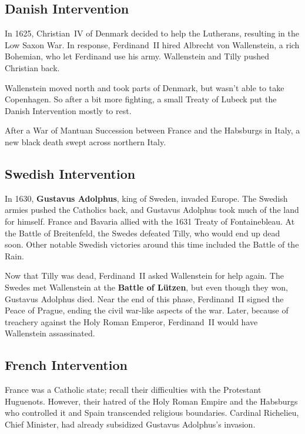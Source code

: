 \subsection*{Danish Intervention}

In 1625, Christian~IV of Denmark decided to help the Lutherans, resulting in the Low Saxon War.
In response, Ferdinand~II hired Albrecht von Wallenstein, a rich Bohemian,
who let Ferdinand use his army.
Wallenstein and Tilly pushed Christian back.

Wallenstein moved north and took parts of Denmark, but wasn't able to take Copenhagen.
So after a bit more fighting, a small Treaty of Lubeck put the Danish Intervention mostly to rest.

After a War of Mantuan Succession between France and the Habsburgs in Italy,
a new black death swept across northern Italy.

\subsection*{Swedish Intervention}

In 1630, \textbf{Gustavus Adolphus}, king of Sweden, invaded Europe.
The Swedish armies pushed the Catholics back, and Gustavus Adolphus took much of the land for himself.
France and Bavaria allied with the 1631 Treaty of Fontainebleau.
At the Battle of Breitenfeld, the Swedes defeated Tilly, who would end up dead soon.
Other notable Swedish victories around this time included the Battle of the Rain.

Now that Tilly was dead, Ferdinand~II asked Wallenstein for help again.
The Swedes met Wallenstein at the \textbf{Battle of L\"utzen},
but even though they won, Gustavus Adolphus died.
Near the end of this phase, Ferdinand~II signed the Peace of Prague,
ending the civil war-like aspects of the war.
Later, because of treachery against the Holy Roman Emperor,
Ferdinand~II would have Wallenstein assassinated.

\subsection*{French Intervention}

France was a Catholic state; recall their difficulties with the Protestant Huguenots.
However, their hatred of the Holy Roman Empire and the Habsburgs who controlled it and Spain
transcended religious boundaries.
Cardinal Richelieu, Chief Minister, had already subsidized Gustavus Adolphus's invasion.

